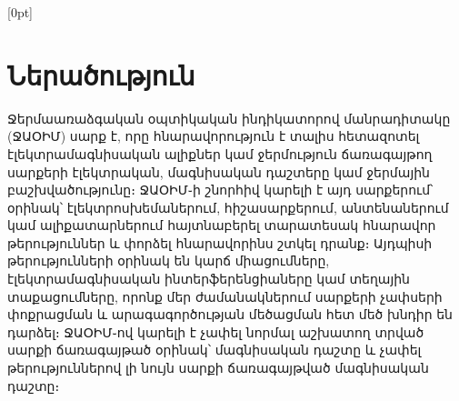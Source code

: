 \documentclass[12pt, fleqn]{report}
\begin{document}
\emergencystretch 3cm

    \thispagestyle{empty}
    \begin{center}
    \end{center}

\newpage

  [0pt]
  {\addvspace{10pt}\bfseries}
  { \hspace{0.0em}}
  {}
  {\hfill\contentspage}
  
\renewcommand{\contentsname}{Բովանդակություն}

\tableofcontents

\newpage

\captionsetup[figure]{name=Նկ․}
\captionsetup{justification=raggedright, width=1.0\textwidth, font=small, format=hang}

\section* {Ներածություն}

Ջերմաառաձգական օպտիկական ինդիկատորով մանրադիտակը 
(ՋԱՕԻՄ) սարք է, որը հնարավորություն է տալիս հետազոտել էլեկտրամագնիսական ալիքներ կամ ջերմություն ճառագայթող սարքերի էլեկտրական, մագնիսական դաշտերը կամ ջերմային բաշխվածությունը։ ՋԱՕԻՄ֊ի շնորհիվ կարելի է այդ սարքերում՝ օրինակ՝ էլեկտրոսխեմաներում, հիշասարքերում, անտենաներում կամ ալիքատարներում հայտնաբերել տարատեսակ հնարավոր թերություններ և փորձել հնարավորինս շտկել դրանք։ Այդպիսի թերությունների օրինակ են կարճ միացումները, էլեկտրամագնիսական ինտերֆերենցիաները կամ տեղային տաքացումները, որոնք մեր ժամանակներում սարքերի չափսերի փոքրացման և արագագործության մեծացման հետ մեծ խնդիր են դարձել։ ՋԱՕԻՄ֊ով կարելի է չափել նորմալ աշխատող տրված սարքի ճառագայթած օրինակ՝ մագնիսական դաշտը և չափել թերություններով լի նույն սարքի ճառագայթված մագնիսական դաշտը։
\end{document}
